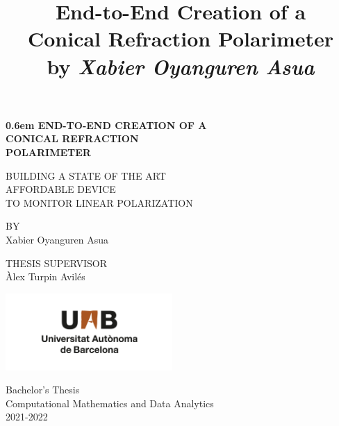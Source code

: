 \documentclass[11pt, a4paper, twoside]{article} %
\title{\vspace{-2cm} {\bf End-to-End Creation of a \\Conical Refraction Polarimeter}\\{\small by {\em Xabier Oyanguren Asua}}\vspace{-0.8cm}}
\date{\vspace{-11ex}}
\begin{document}
\clearpage
\newcommand\nbvspace[1][3]{\vspace*{\stretch{#1}}}
\newcommand\nbstretchyspace{\spaceskip0.5em plus 0.25em minus 0.25em}
\newcommand{\nbtitlestretch}{\spaceskip0.6em}
\pagestyle{empty}
\begin{center}
\bfseries
\nbvspace[1]
\Huge
{\nbtitlestretch
{\normalsize END-TO-END CREATION OF A }\\
\Huge CONICAL REFRACTION \\
POLARIMETER }

\nbvspace[4]
{\small

BUILDING A STATE OF THE ART\vspace{0.2cm}\\ AFFORDABLE DEVICE\vspace{0.2cm}\\ TO MONITOR LINEAR POLARIZATION\\
}

\normalsize

\nbvspace[5]
\small BY\\
\Large Xabier Oyanguren Asua\\[0.5em]

\nbvspace[5]

\small THESIS SUPERVISOR \vspace{0.15cm}\\
\Large Àlex Turpin Avilés

\nbvspace[1]

\includegraphics[width=2.5in]{UAB.png}
\normalsize
\vspace{-0.5cm}

\large
\small
Bachelor's Thesis \\ Computational Mathematics and Data Analytics \\
\vspace{0.1cm}
\small
2021-2022
\nbvspace[1]
\end{center}
\newpage
\null
\clearpage
\end{document}
